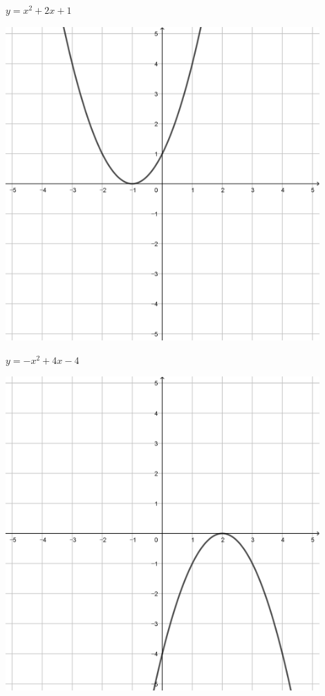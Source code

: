 \documentclass[a4paper]{oblivoir}
\begin{document}
\clearpage
\begin{minipage}{0.45\textwidth}\centering
\(y=x^2+2x+1\)
\par\bigskip\includegraphics[width=0.9\textwidth]{img/2_quadratic_21}
\end{minipage}
\begin{minipage}{0.45\textwidth}\centering
\(y=-x^2+4x-4\)
\par\bigskip\includegraphics[width=0.9\textwidth]{img/2_quadratic_22}
\end{minipage}\bigskip\bigskip\par
\end{document}

